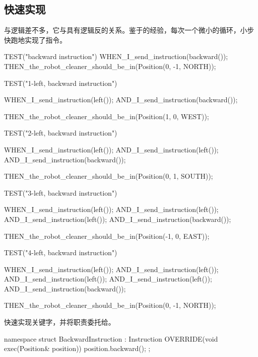 \begin{content}

\subsection{快速实现}

与逻辑差不多，它与具有逻辑反的关系。鉴于的经验，每次一个微小的循环，小步快跑地实现了指令。

\begin{leftbar}
\begin{c++}[caption={test/robot-cleaner/TestRobotCleaner.h}]
TEST("backward instruction")
{
    WHEN_I_send_instruction(backward());
    THEN_the_robot_cleaner_should_be_in(Position(0, -1, NORTH));
}

TEST("1-left, backward instruction")
{
    WHEN_I_send_instruction(left());
    AND_I_send_instruction(backward());
    
    THEN_the_robot_cleaner_should_be_in(Position(1, 0, WEST));
}

TEST("2-left, backward instruction")
{
    WHEN_I_send_instruction(left());
    AND_I_send_instruction(left());
    AND_I_send_instruction(backward());
  
    THEN_the_robot_cleaner_should_be_in(Position(0, 1, SOUTH));
}

TEST("3-left, backward instruction")
{
    WHEN_I_send_instruction(left());
    AND_I_send_instruction(left());
    AND_I_send_instruction(left());
    AND_I_send_instruction(backward());

    THEN_the_robot_cleaner_should_be_in(Position(-1, 0, EAST));
}

TEST("4-left, backward instruction")
{
    WHEN_I_send_instruction(left());
    AND_I_send_instruction(left());
    AND_I_send_instruction(left());
    AND_I_send_instruction(left());
    AND_I_send_instruction(backward());

    THEN_the_robot_cleaner_should_be_in(Position(0, -1, NORTH));
}
\end{c++}
\end{leftbar}

快速实现关键字，并将职责委托给。

\begin{leftbar}
\begin{c++}[caption={src/robot-cleaner/Instruction.cpp}]
namespace
{
    struct BackwardInstruction : Instruction
    {
        OVERRIDE(void exec(Position& position))
        {
            position.backward();
        }
    };
}


\end{c++}
\end{leftbar}
\end{content}
